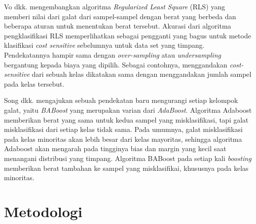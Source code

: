 \documentclass[12pt,a4paper,titlepage]{article}
\begin{document}
Vo dkk. \cite{vo2007classification} mengembangkan algoritma \textit{Regularized Least Square} (RLS) yang memberi nilai dari galat dari sampel-sampel dengan berat yang berbeda dan beberapa aturan untuk menentukan berat tersebut.
Akurasi dari algoritma pengklasifikasi RLS memperlihatkan sebagai pengganti yang bagus untuk metode klasifikasi \textit{cost sensitive} sebelumnya untuk data set yang timpang.
Pendekatannya hampir sama dengan \textit{over-sampling} atau \hfill\break
\textit{under\-sampling} bergantung kepada biaya yang dipilih.
Sebagai contohnya, menggandakan \textit{cost-sensitive} dari sebuah kelas dikatakan sama dengan menggandakan jumlah sampel pada kelas tersebut.

Song dkk. \cite{song2009improved} mengajukan sebuah pendekatan baru mengurangi setiap kelompok galat, yaitu \textit{BABoost} yang merupakan varian dari \textit{AdaBoost}.
Algoritma Adaboost memberikan berat yang sama untuk kedua sampel yang misklasifikasi, tapi galat misklasifikasi dari setiap kelas tidak sama.
Pada umumnya, galat misklasifikasi pada kelas minoritas akan lebih besar dari kelas mayoritas, sehingga algoritma Adaboost akan mengarah pada tingginya bias dan margin yang kecil saat menangani distribusi yang timpang.
Algoritma BABoost pada setiap kali \textit{boosting} memberikan berat tambahan ke sampel yang misklasifikai, khususnya pada kelas minoritas.

\section{Metodologi}\label{sec:metodologi}
\end{document}
